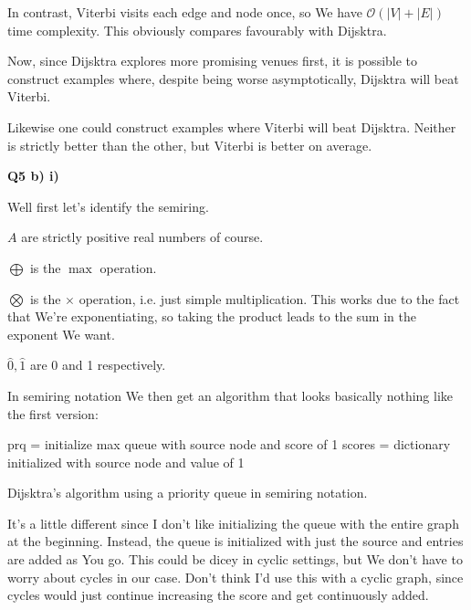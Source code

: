 \documentclass{article}
\begin{document}
	In contrast, Viterbi visits each edge and node once, so We have $\mathcal{O}(|V| + |E|)$ time complexity. This obviously compares favourably with Dijsktra.
	
	Now, since Dijsktra explores more promising venues first, it is possible to construct examples where, despite being worse asymptotically, Dijsktra will beat Viterbi. 
	
	Likewise one could construct examples where Viterbi will beat Dijsktra. Neither is strictly better than the other, but Viterbi is better on average.
	
\textbf{Q5 b) i)}

	Well first let's identify the semiring.
	
	$A$ are strictly positive real numbers of course.
	
	$\bigoplus$ is the $\max$ operation. 
	
	$\bigotimes$ is the $\times$ operation, i.e. just simple multiplication. This works due to the fact that We're exponentiating, so taking the product leads to the sum in the exponent We want.
	
	$\hat{0}, \hat{1}$ are 0 and 1 respectively.
	
	In semiring notation We then get an algorithm that looks basically nothing like the first version:
	
	\begin{algorithm}[H]
		prq = initialize max queue with source node and score of 1\;
		scores = dictionary initialized with source node and value of 1\;
		 \caption{Dijsktra's algorithm using a priority queue in semiring notation.}
	\end{algorithm}
	
	It's a little different since I don't like initializing the queue with the entire graph at the beginning. Instead, the queue is initialized with just the source and entries are added as You go. This could be dicey in cyclic settings, but We don't have to worry about cycles in our case. Don't think I'd use this with a cyclic graph, since cycles would just continue increasing the score and get continuously added.
	
\end{document}
